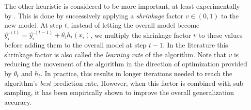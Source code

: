 The other heuristic is considered to be more important, at least experimentally by \textcite{hastie-elemstatslearn}. This is done by successively applying a \textit{shrinkage} factor $v \in (0,1)$ to the new model. At step $t$, instead of letting the overall model become $ \hat{y_i}^{(t)} = \hat{y_i}^{(t-1)} + \theta_t h_t(x_i) $, we multiply the shrinkage factor $v$ to these values before adding them to the overall model at step $t-1$. In the literature this shrinkage factor is also called the \textit{learning rate} of the algorithm. Note that $v$ is reducing the movement of the algorithm in the direction of optimization provided by $\theta_t$ and $h_t$. In practice, this results in longer iterations needed to reach the algorithm's \textit{best} prediction rate. However, when this factor is combined with sub sampling, it has been empirically shown to improve the overall generalization accuracy.



%
%
%
%
%
